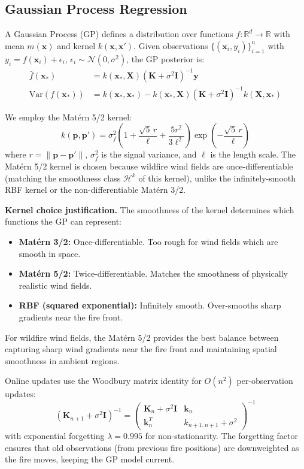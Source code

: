 \documentclass[12pt,a4paper]{article}
\DeclareRobustCommand{\cH}{\mathcal{H}}
\DeclareRobustCommand{\cN}{\mathcal{N}}
\DeclareRobustCommand{\R}{\mathbb{R}}
\DeclareRobustCommand{\vect}[1]{\bm{#1}}
\DeclareRobustCommand{\mat}[1]{\bm{#1}}
\begin{document}
\subsection{Gaussian Process Regression}

A Gaussian Process (GP) defines a distribution over functions $f : \R^d \to \R$ with mean $m(\vect{x})$ and kernel $k(\vect{x}, \vect{x}')$. Given observations $\{(\vect{x}_i, y_i)\}_{i=1}^n$ with $y_i = f(\vect{x}_i) + \epsilon_i$, $\epsilon_i \sim \cN(0, \sigma^2)$, the GP posterior is:
\begin{align}
    \bar{f}(\vect{x}_*) &= k(\vect{x}_*, \vect{X})(\mat{K} + \sigma^2\mat{I})^{-1}\vect{y} \label{eq:gp_mean}\\
    \text{Var}(f(\vect{x}_*)) &= k(\vect{x}_*, \vect{x}_*) - k(\vect{x}_*, \vect{X})(\mat{K} + \sigma^2\mat{I})^{-1}k(\vect{X}, \vect{x}_*) \label{eq:gp_var}
\end{align}

We employ the Mat\'ern 5/2 kernel:
\begin{equation}
    k(\vect{p}, \vect{p}') = \sigma_f^2 \left(1 + \frac{\sqrt{5}\,r}{\ell} + \frac{5r^2}{3\ell^2}\right)\exp\left(-\frac{\sqrt{5}\,r}{\ell}\right)
    \label{eq:matern}
\end{equation}
where $r = \|\vect{p} - \vect{p}'\|$, $\sigma_f^2$ is the signal variance, and $\ell$ is the length scale. The Mat\'ern 5/2 kernel is chosen because wildfire wind fields are once-differentiable (matching the smoothness class $\cH^k$ of this kernel), unlike the infinitely-smooth RBF kernel or the non-differentiable Mat\'ern 3/2.

\textbf{Kernel choice justification.} The smoothness of the kernel determines which functions the GP can represent:
\begin{itemize}[leftmargin=*]
    \item \textbf{Mat\'ern 3/2:} Once-differentiable. Too rough for wind fields which are smooth in space.
    \item \textbf{Mat\'ern 5/2:} Twice-differentiable. Matches the smoothness of physically realistic wind fields.
    \item \textbf{RBF (squared exponential):} Infinitely smooth. Over-smooths sharp gradients near the fire front.
\end{itemize}
For wildfire wind fields, the Mat\'ern 5/2 provides the best balance between capturing sharp wind gradients near the fire front and maintaining spatial smoothness in ambient regions.

Online updates use the Woodbury matrix identity for $O(n^2)$ per-observation updates:
\begin{equation}
    (\mat{K}_{n+1} + \sigma^2\mat{I})^{-1} = \begin{pmatrix} \mat{K}_n + \sigma^2\mat{I} & \vect{k}_n \\ \vect{k}_n^T & k_{n+1,n+1} + \sigma^2 \end{pmatrix}^{-1}
\end{equation}
with exponential forgetting $\lambda = 0.995$ for non-stationarity. The forgetting factor ensures that old observations (from previous fire positions) are downweighted as the fire moves, keeping the GP model current.
\end{document}
